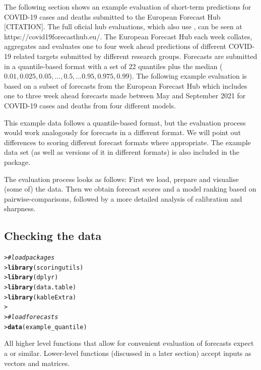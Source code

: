 \documentclass[article,shortnames]{jss}\usepackage[]{graphicx}\usepackage[]{color}
\makeatletter
\newcommand{\hlcom}[1]{\textcolor[rgb]{0.678,0.584,0.686}{\textit{#1}}}%
\newcommand{\hlstd}[1]{\textcolor[rgb]{0.345,0.345,0.345}{#1}}%
\newcommand{\hlkwd}[1]{\textcolor[rgb]{0.737,0.353,0.396}{\textbf{#1}}}%
\newenvironment{kframe}{%
 \def\at@end@of@kframe{}%
 \ifinner\ifhmode%
  \def\at@end@of@kframe{\end{minipage}}%
  \begin{minipage}{\columnwidth}%
 \fi\fi%
 \def\FrameCommand##1{\hskip\@totalleftmargin \hskip-\fboxsep
 \colorbox{shadecolor}{##1}\hskip-\fboxsep
     \hskip-\linewidth \hskip-\@totalleftmargin \hskip\columnwidth}%
 \MakeFramed {\advance\hsize-\width
   \@totalleftmargin\z@ \linewidth\hsize
   \@setminipage}}%
 {\par\unskip\endMakeFramed%
 \at@end@of@kframe}
\newenvironment{knitrout}{}{} %
\makeatother
\begin{document}
The following section shows an example evaluation of short-term predictions for COVID-19 cases and deaths submitted to the European Forecast Hub [CITATION]. The full oficial hub evaluations, which also use , can be seen at https://covid19forecasthub.eu/. The European Forecast Hub each week collates, aggregates and evaluates one to four week ahead predictions of different COVID-19 related targets submitted by different research groups. Forecasts are submitted in a quantile-based format with a set of 22 quantiles plus the median ($0.01, 0.025, 0.05, ..., 0.5, ... 0.95, 0.975, 0.99$). The following example evaluation is based on a subset of forecasts from the European Forecast Hub which includes one to three week ahead forecasts made between May and September 2021 for COVID-19 cases and deaths from four different models. 

This example data follows a quantile-based format, but the evaluation process would work analogously for forecasts in a different format. We will point out differences to scoring different forecast formats where appropriate. The example data set (as well as versions of it in different formats) is also included in the  package. 

The evaluation process looks as follows: First we load, prepare and visualise (some of) the data. Then we obtain forecast scores and a model ranking based on pairwise-comparisons, followed by a more detailed analysis of calibration and sharpness. 

\subsection{Checking the data}

% 
\begin{knitrout}
\color{fgcolor}\begin{kframe}
\begin{alltt}
\hlstd{> }\hlcom{# load packages}
\hlstd{> }\hlkwd{library}\hlstd{(scoringutils)}
\hlstd{> }\hlkwd{library}\hlstd{(dplyr)}
\hlstd{> }\hlkwd{library}\hlstd{(data.table)}
\hlstd{> }\hlkwd{library}\hlstd{(kableExtra)}
\hlstd{> }
\hlstd{> }\hlcom{# load forecasts}
\hlstd{> }\hlkwd{data}\hlstd{(example_quantile)}
\end{alltt}
\end{kframe}
\end{knitrout}
% 
All higher level functions that allow for convenient evaluation of forecasts expect a  or similar. Lower-level functions (discussed in a later section) accept inputs as vectors and matrices. 
\end{document}
